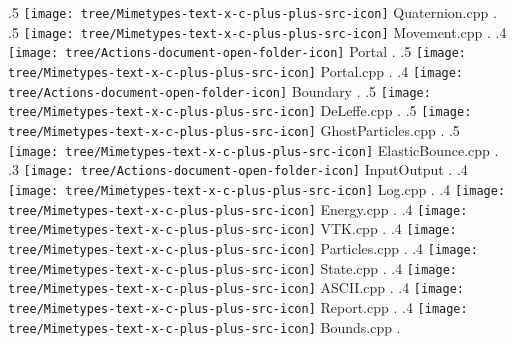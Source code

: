 {.5 { \texttt{[image: tree/Mimetypes-text-x-c-plus-plus-src-icon]} Quaternion.cpp }.
.5 { \texttt{[image: tree/Mimetypes-text-x-c-plus-plus-src-icon]} Movement.cpp }.
.4 { \texttt{[image: tree/Actions-document-open-folder-icon]} Portal }.
.5 { \texttt{[image: tree/Mimetypes-text-x-c-plus-plus-src-icon]} Portal.cpp }.
.4 { \texttt{[image: tree/Actions-document-open-folder-icon]} Boundary }.
.5 { \texttt{[image: tree/Mimetypes-text-x-c-plus-plus-src-icon]} DeLeffe.cpp }.
.5 { \texttt{[image: tree/Mimetypes-text-x-c-plus-plus-src-icon]} GhostParticles.cpp }.
.5 { \texttt{[image: tree/Mimetypes-text-x-c-plus-plus-src-icon]} ElasticBounce.cpp }.
.3 { \texttt{[image: tree/Actions-document-open-folder-icon]} InputOutput }.
.4 { \texttt{[image: tree/Mimetypes-text-x-c-plus-plus-src-icon]} Log.cpp }.
.4 { \texttt{[image: tree/Mimetypes-text-x-c-plus-plus-src-icon]} Energy.cpp }.
.4 { \texttt{[image: tree/Mimetypes-text-x-c-plus-plus-src-icon]} VTK.cpp }.
.4 { \texttt{[image: tree/Mimetypes-text-x-c-plus-plus-src-icon]} Particles.cpp }.
.4 { \texttt{[image: tree/Mimetypes-text-x-c-plus-plus-src-icon]} State.cpp }.
.4 { \texttt{[image: tree/Mimetypes-text-x-c-plus-plus-src-icon]} ASCII.cpp }.
.4 { \texttt{[image: tree/Mimetypes-text-x-c-plus-plus-src-icon]} Report.cpp }.
.4 { \texttt{[image: tree/Mimetypes-text-x-c-plus-plus-src-icon]} Bounds.cpp }.
}

